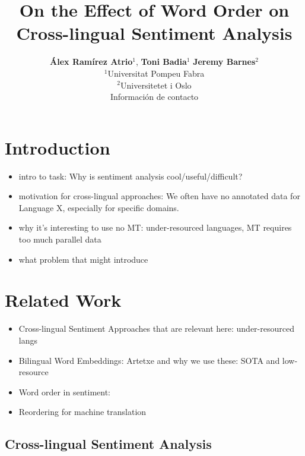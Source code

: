 \documentclass[a4paper,11pt,twocolumn,twoside]{article}
\title{On the Effect of Word Order on Cross-lingual Sentiment Analysis}
\author {\textbf{Álex Ramírez Atrio$^1$}, \textbf{Toni Badia$^{1}$} \textbf{Jeremy Barnes$^{2}$}\\
$^1$Universitat Pompeu Fabra\\
$^2$Universitetet i Oslo\\
Información de contacto\\
}
\begin{document}



\label{firstpage} \maketitle

%

\section{Introduction}

\begin{itemize}
\item intro to task: Why is sentiment analysis cool/useful/difficult?
\item motivation for cross-lingual approaches: We often have no annotated data for Language X, especially for specific domains.
\item why it's interesting to use no MT: under-resourced languages, MT requires too much parallel data
\item what problem that might introduce
\end{itemize}

\section{Related Work}

\begin{itemize}

\item Cross-lingual Sentiment Approaches that are relevant here: under-resourced langs
\item Bilingual Word Embeddings: Artetxe and why we use these: SOTA and low-resource
\item Word order in sentiment:
\item Reordering for machine translation
\end{itemize}

\subsection{Cross-lingual Sentiment Analysis}
\end{document}
